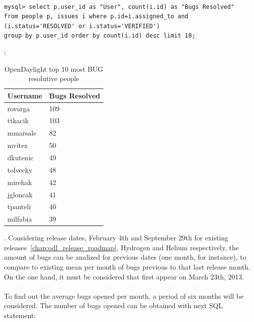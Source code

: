 \documentclass[a4paper, 12pt]{book}
\begin{document}
{\begin{verbatim}

mysql> select p.user_id as "User", count(i.id) as "Bugs Resolved"
from people p, issues i where p.id=i.assigned_to and
(i.status='RESOLVED' or i.status='VERIFIED')
group by p.user_id order by count(i.id) desc limit 10;

\end{verbatim}
:
\begin{table}[H]
\footnotesize
\begin{center}
\begin{tabular}{|p{3cm}|p{3cm}|}
\hline
\textbf{Username} & \textbf{Bugs Resolved} \\ \hline
rovarga  & 109 \\ \hline
ttkacik  & 103 \\ \hline
mmarsale & 82  \\ \hline
mvitez   & 50  \\ \hline
dkutenic & 49  \\ \hline
tolvecky & 48  \\ \hline
mirehak  & 42  \\ \hline
jgloncak & 41  \\ \hline
tpanteli & 40  \\ \hline
milfabia & 39  \\ \hline
\end{tabular}
\end{center}
\caption{OpenDaylight top 10 most BUG resolutive people}
\label{tab:odl_top_people_resolving_bugs}
\end{table}
. Considering release dates, February 4th and September 29th for existing releases~\ref{chap:odl_release_roadmap}, Hydrogen and Helium respectively, the amount of bugs can be analized for previous dates (one month, for instance), to compare to existing mean per month of bugs previous to that last release month. On the one hand, it must be considered that first  appear on March 23th, 2013.\\
\\
To find out the average bugs opened per month, a period of six months will be considered. The number of bugs opened can be obtained with next SQL statement:

\begin{verbatim}


\end{verbatim}}
\end{document}
